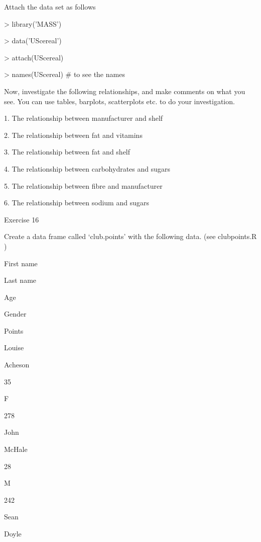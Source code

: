 Attach the data set as follows

> library('MASS')

> data('UScereal')

> attach(UScereal)

> names(UScereal)         # to see the names

 

Now, investigate the following relationships, and make comments on what you see. You can use tables, barplots, scatterplots etc. to do your investigation.

 

1. The relationship between manufacturer and shelf

2. The relationship between fat and vitamins

3. The relationship between fat and shelf

4. The relationship between carbohydrates and sugars

5. The relationship between fibre and manufacturer

6. The relationship between sodium and sugars

 

Exercise 16

 

Create a data frame called ‘club.points’ with the following data. (see clubpoints.R )

 











First name
 

Last name
 

Age
 

Gender
 

Points
 



Louise
 

Acheson
 

35
 

F
 

278
 



John
 

McHale
 

28
 

M
 

242
 



Sean
 

Doyle
 

